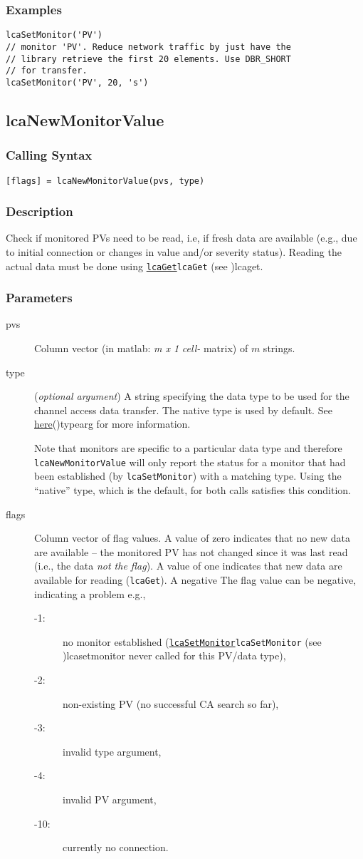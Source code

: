 \documentclass{article}
\newcommand{\com}[1]{{\tt #1}}
\newcommand{\pbrk}{\pagebreak[3]}
\newcommand{\comref}[2]{\hyperref[ref]{\com{#1}}{\com{#1} (see }{)}{#2}}
\newcommand{\ita}[1]{\emph{#1}}
\newcommand{\m}{$m$}
\newcommand{\mhack}{$m$} %
\newcommand{\mxl}{$m\times 1$}
\renewcommand{\m}{\ita{m}}
\newcommand{\mhack}{\ita{m}} %
\renewcommand{\mxl}{\ita{m x 1}}
\renewcommand{\pbrk}{}
\newcommand{\PVITEM}{
\item[pvs] Column vector (in matlab: \mxl{} \ita{cell-} matrix)
of \mhack{} strings.
}
\begin{document}
\subsubsection{Examples}
\begin{verbatim}
lcaSetMonitor('PV')
// monitor 'PV'. Reduce network traffic by just have the
// library retrieve the first 20 elements. Use DBR_SHORT
// for transfer.
lcaSetMonitor('PV', 20, 's')
\end{verbatim}

\pbrk
\subsection{lcaNewMonitorValue}
\label{lcanewmonitorvalue}
\subsubsection{Calling Syntax}
\begin{verbatim}
[flags] = lcaNewMonitorValue(pvs, type)
\end{verbatim}
\subsubsection{Description}
Check if monitored PVs need to be read, i.e, if fresh data are available (e.g., due to
initial connection or changes in value and/or severity status). Reading the actual
data must be done using \comref{lcaGet}{lcaget}.
\subsubsection{Parameters}
\begin{description}
\PVITEM
\item[type]
(\ita{optional argument}) A string specifying the
data type to be used for the channel access data transfer. The
native type is used by default.
See \hyperref[ref]{here}{(}{)}{typearg} for more information.

Note that monitors are specific to a particular data type and therefore
\com{lcaNewMonitorValue} will only report the status for a monitor that had been established
(by \com{lcaSetMonitor}) with a matching type.
Using the ``native'' type, which is the default, for both calls
satisfies this condition.
\item[flags]
Column vector of flag values. A value of zero indicates that no new data are available --
the monitored PV has not changed since it was last read (i.e., the data {\em not the flag}).
A value of one indicates that new data are available for reading (\com{lcaGet}). A negative
The flag value can be negative, indicating a problem e.g.,
\begin{description}
\item[-1:]
  no monitor established (\comref{lcaSetMonitor}{lcasetmonitor} never
  called for this PV/data type),
\item[-2:]
  non-existing PV (no successful CA search so far),
\item[-3:]
  invalid type argument,
\item[-4:]
  invalid PV argument,
\item[-10:]
  currently no connection.
\end{description}
\end{description}
\end{document}
